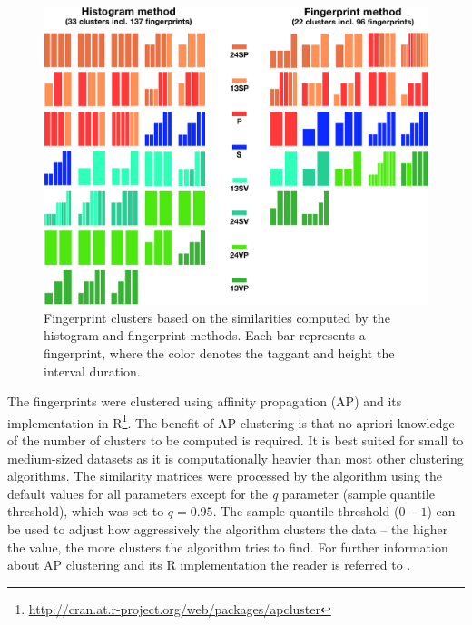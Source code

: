 \documentclass[thesis.tex]{subfiles}
\begin{document}
\begin{figure}[h]
\centering \includegraphics[page=1,width=\textwidth,height=\textheight,keepaspectratio=true]{images/experiment/clusters}
\caption{Fingerprint clusters based on the similarities computed by the histogram and fingerprint methods. Each bar represents a fingerprint, where the color denotes the taggant and height the interval duration.}
\label{figure:clusters}
\end{figure}

The fingerprints were clustered using affinity propagation (AP) and its implementation in R\footnote{\url{http://cran.at.r-project.org/web/packages/apcluster}}. The benefit of AP clustering is that no apriori knowledge of the number of clusters to be computed is required. It is best suited for small to medium-sized datasets as it is computationally heavier than most other clustering algorithms. The similarity matrices were processed by the algorithm using the default values for all parameters except for the \emph{q} parameter (sample quantile threshold), which was set to $q=0.95$. The sample quantile threshold ($0-1$) can be used to adjust how aggressively the algorithm clusters the data -- the higher the value, the more clusters the algorithm tries to find. For further information about AP clustering and its R implementation the reader is referred to \cite{affinity_propagation}.
\end{document}
